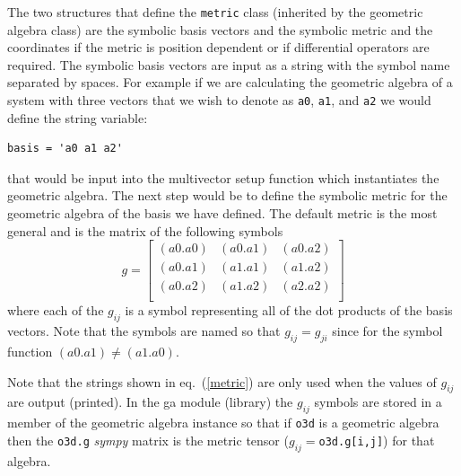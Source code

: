 \documentclass[12pt,twoside,openright]{memoir}
\newcommand{\lbrk}{\left [}
\newcommand{\rbrk}{\right ]}
\newcommand{\T}[1]{\texttt{#1}}
\begin{document}
The two structures that define the \T{metric} class (inherited by the 
geometric algebra class) are the
symbolic basis vectors and the symbolic metric and the coordinates if
the metric is position dependent or if differential operators are required.  
The symbolic basis
vectors are input as a string with the symbol name separated by spaces.  For
example if we are calculating the geometric algebra of a system with three
vectors that we wish to denote as \T{a0}, \T{a1}, and \T{a2} we would define the
string variable:
\begin{lstlisting}[numbers=none]
  basis = 'a0 a1 a2'
\end{lstlisting}  
that would be input into the multivector setup function which instantiates the geometric
algebra.  The next step would be
to define the symbolic metric for the geometric algebra of the basis we
have defined. The default metric is the most general and is the matrix of
the following symbols
  \begin{equation}\label{metric}
  g = \lbrk
  \begin{array}{ccc}
    (a0.a0)   & (a0.a1)  & (a0.a2) \\
    (a0.a1) & (a1.a1)  & (a1.a2) \\
    (a0.a2) & (a1.a2) & (a2.a2) \\
  \end{array}
  \rbrk
  \end{equation}
where each of the $g_{ij}$ is a symbol representing all of the dot
products of the basis vectors. Note that the symbols are named so that
$g_{ij} = g_{ji}$ since for the symbol function
$(a0.a1) \ne (a1.a0)$.

Note that the strings shown in eq.~(\ref{metric}) are only used when the values
of $g_{ij}$ are output (printed).   In the ga module (library)
the $g_{ij}$ symbols are stored in a member of the geometric algebra
instance so that if  \T{o3d} is a geometric algebra then the \T{o3d.g} {\em sympy} matrix is
the metric tensor ($g_{ij} = $\T{o3d.g[i,j]}) for that algebra.
\end{document}
